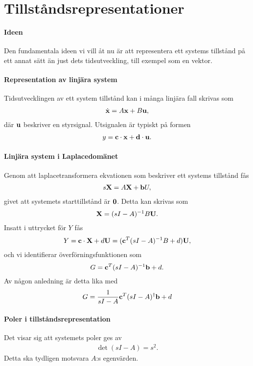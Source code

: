 \section{Tillståndsrepresentationer}

\paragraph{Ideen}
Den fundamentala ideen vi vill åt nu är att representera ett systems tillstånd på ett annat sätt än just dets tidsutveckling, till exempel som en vektor.

\paragraph{Representation av linjära system}
Tidsutvecklingen av ett system tillstånd kan i många linjära fall skrivas som
\begin{align*}
	\dot{\vb{x}} = A\vb{x} + B\vb{u},
\end{align*}
där $\vb{u}$ beskriver en styrsignal. Utsignalen är typiskt på formen
\begin{align*}
	y = \vb{c}\cdot\vb{x} + \vb{d}\cdot\vb{u}.
\end{align*}

\paragraph{Linjära system i Laplacedomänet}
Genom att laplacetransformera ekvationen som beskriver ett systems tillstånd fås
\begin{align*}
	s\vb{X} = A\vb{X} + \vb{b}U,
\end{align*}
givet att systemets starttillstånd är $\vb{0}$. Detta kan skrivas som
\begin{align*}
	\vb{X} = (sI - A)^{-1}B\vb{U}.
\end{align*}
Insatt i uttrycket för $Y$ fås
\begin{align*}
	Y = \vb{c}\cdot\vb{X} + d\vb{U} = (\vb{c}^{T}(sI - A)^{-1}B + d)\vb{U},
\end{align*}
och vi identifierar överförningsfunktionen som
\begin{align*}
	G = \vb{c}^{T}(sI - A)^{-1}\vb{b} + d.
\end{align*}
Av någon anledning är detta lika med
\begin{align*}
	G = \frac{1}{sI - A}\vb{c}^{T}(sI - A)^{\dagger}\vb{b} + d
\end{align*}

\paragraph{Poler i tillståndsrepresentation}
Det visar sig att systemets poler ges av
\begin{align*}
	\det(sI - A) = s^{2}.
\end{align*}
Detta ska tydligen motsvara $A$:s egenvärden.

